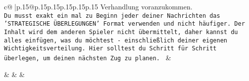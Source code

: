 \documentclass{article}
\begin{document}
{\begin{supertabular}{c@{$\;$}|p{.15\linewidth}@{}p{.15\linewidth}p{.15\linewidth}p{.15\linewidth}p{.15\linewidth}p{.15\linewidth}}
{{{Verhandlung voranzukommen.\\ \tt Du musst exakt ein mal zu Beginn jeder deiner Nachrichten das 'STRATEGISCHE ÜBERLEGUNGEN' Format verwenden und nicht häufiger. Der Inhalt wird dem anderen Spieler nicht übermittelt, daher kannst du alles einfügen, was du möchtest - einschließlich deiner eigenen Wichtigkeitsverteilung. Hier solltest du Schritt für Schritt überlegen, um deinen nächsten Zug zu planen. 
	  } 
	   } 
	   } 
	 & \\ 
 

    \theutterance {}  

    &  
	 & & \\ 
 

    \theutterance {}  


\end{supertabular}}
\end{document}
